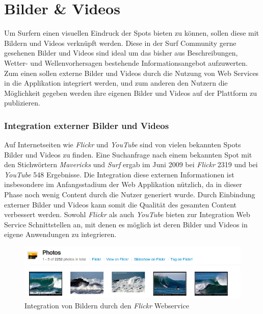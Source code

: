 \section{Bilder \& Videos}
Um Surfern einen visuellen Eindruck der Spots bieten zu können, sollen
diese mit Bildern und Videos verknüpft werden. Diese in der Surf
Community gerne gesehenen Bilder und Videos sind ideal um das bisher
aus Beschreibungen, Wetter- und Wellenvorhersagen bestehende
Informationsangebot aufzuwerten. Zum einen sollen externe Bilder und
Videos durch die Nutzung von Web Services in die Applikation
integriert werden, und zum anderen den Nutzern die Möglichkeit gegeben
werden ihre eigenen Bilder und Videos auf der Plattform zu
publizieren.

\subsubsection{Integration externer Bilder und Videos}
Auf Internetseiten wie \textit{Flickr} und \textit{YouTube} sind von
vielen bekannten Spots Bilder und Videos zu finden. Eine Suchanfrage
nach einem bekannten Spot mit den Stichwörtern \textit{Mavericks} und
\textit{Surf} ergab im Juni 2009 bei \textit{Flickr} 2319 und bei
\textit{YouTube} 548 Ergebnisse. Die Integration diese externen
Informationen ist insbesondere im Anfangsstadium der Web Applikation
nützlich, da in dieser Phase noch wenig Content durch die Nutzer
generiert wurde. Durch Einbindung externer Bilder und Videos kann
somit die Qualität des gesamten Content verbessert werden. Sowohl
\textit{Flickr} als auch \textit{YouTube} bieten zur Integration Web
Service Schnittstellen an, mit denen es möglich ist deren Bilder und
Videos in eigene Anwendungen zu integrieren.

\begin{figure}[h]
 \includegraphics[width=\textwidth]{bilder/photos-flickr}
 \caption{Integration von Bildern durch den \textit{Flickr}
      Webservice}
 \label{piktogramm}
\end{figure}

